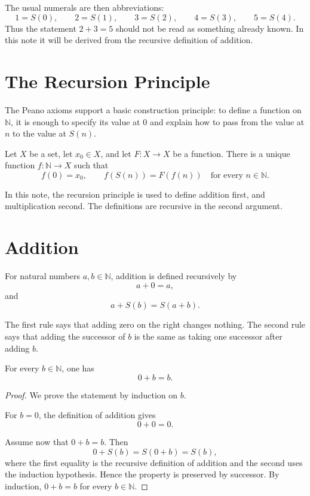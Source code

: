 The usual numerals are then abbreviations:
\[
1=S(0),\qquad 2=S(1),\qquad 3=S(2),\qquad 4=S(3),\qquad 5=S(4).
\]
Thus the statement \(2+3=5\) should not be read as something already known. In
this note it will be derived from the recursive definition of addition.

\section{The Recursion Principle}

The Peano axioms support a basic construction principle: to define a function
on \(\mathbb{N}\), it is enough to specify its value at \(0\) and explain how to
pass from the value at \(n\) to the value at \(S(n)\).

\begin{theorembox}
Let \(X\) be a set, let \(x_0\in X\), and let \(F:X\to X\) be a function. There
is a unique function \(f:\mathbb{N}\to X\) such that
\[
f(0)=x_0,
\qquad
f(S(n))=F(f(n))
\quad\text{for every } n\in\mathbb{N}.
\]
\end{theorembox}

In this note, the recursion principle is used to define addition first, and
multiplication second. The definitions are recursive in the second argument.

\section{Addition}

\begin{definitionbox}
For natural numbers \(a,b\in\mathbb{N}\), addition is defined recursively by
\[
a+0=a,
\]
and
\[
a+S(b)=S(a+b).
\]
\end{definitionbox}

The first rule says that adding zero on the right changes nothing. The second
rule says that adding the successor of \(b\) is the same as taking one successor
after adding \(b\).

\begin{proposition}
For every \(b\in\mathbb{N}\), one has
\[
0+b=b.
\]
\end{proposition}

\begin{proof}
We prove the statement by induction on \(b\).

For \(b=0\), the definition of addition gives
\[
0+0=0.
\]

Assume now that \(0+b=b\). Then
\[
0+S(b)=S(0+b)=S(b),
\]
where the first equality is the recursive definition of addition and the second
uses the induction hypothesis. Hence the property is preserved by successor.
By induction, \(0+b=b\) for every \(b\in\mathbb{N}\).
\end{proof}

